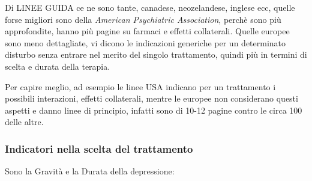 Di LINEE GUIDA ce ne sono tante, canadese, neozelandese, inglese ecc,
quelle forse migliori sono della \emph{American Psychiatric
Association}, perchè sono più approfondite, hanno più pagine su farmaci
e effetti collaterali. Quelle europee sono meno dettagliate, vi dicono
le indicazioni generiche per un determinato disturbo senza entrare nel
merito del singolo trattamento, quindi più in termini di scelta e durata
della terapia.

Per capire meglio, ad esempio le linee USA indicano per un trattamento i
possibili interazioni, effetti collaterali, mentre le europee non
considerano questi aspetti e danno linee di principio, infatti sono di
10-12 pagine contro le circa 100 delle altre.

\subsubsection{Indicatori nella scelta del trattamento}

Sono la Gravità e la Durata della depressione:

